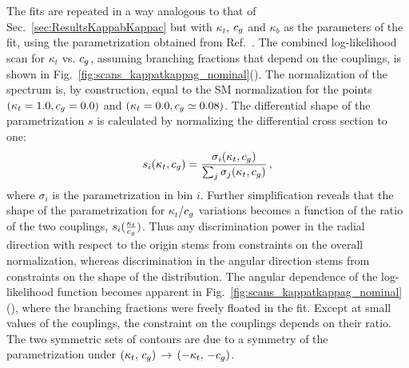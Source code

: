 The fits are repeated in a way analogous to that of Sec.~\ref{sec:ResultsKappabKappac} but with $\kappa_t$, $c_g$ and $\kappa_b$ as the parameters of the fit, using the parametrization obtained from Ref.~\cite{Grazzini:2017szg}.
% 
% 
The combined log-likelihood scan for $\kappa_t$ vs. $c_g$, assuming branching fractions that depend on the couplings, is shown in Fig.~\ref{fig:scans_kappatkappag_nominal}(\cmsLeft).
% 
The normalization of the spectrum is, by construction, equal to the SM normalization for the points $( \kappa_t = 1.0, c_g = 0.0 )$ and $( \kappa_t = 0.0, c_g \simeq 0.08 )$.
% 
The differential shape of the parametrization $s$ is calculated by normalizing the differential cross section to one:
% 
\begin{equation}
    s_i(\kappa_t, c_g) =
        \frac
            {\sigma_i(\kappa_t, c_g)}
            {\sum_j \sigma_j(\kappa_t, c_g)}
    \,,
\end{equation}
% 
where $\sigma_i$ is the parametrization in bin $i$.
% 
Further simplification %
% 
% 
reveals that the shape of the parametrization for $\kappa_t$/$c_g$ variations becomes a function of the ratio of the two couplings, $s_i(\frac{\kappa_t}{c_g})$.
% 
Thus any discrimination power in the radial direction with respect to the origin stems from constraints on the overall normalization, whereas discrimination in the angular direction stems from constraints on the shape of the distribution.
% 
The angular dependence of the log-likelihood function becomes apparent in Fig.~\ref{fig:scans_kappatkappag_nominal}(\cmsRight), where the branching fractions were freely floated in the fit.
% 
Except at small values of the couplings, the constraint on the couplings depends on their ratio.
% 
The two symmetric sets of contours are due to a symmetry of the parametrization under $(\kappa_t,\,c_g) \, \to \, (-\kappa_t,\,-c_g)$.


